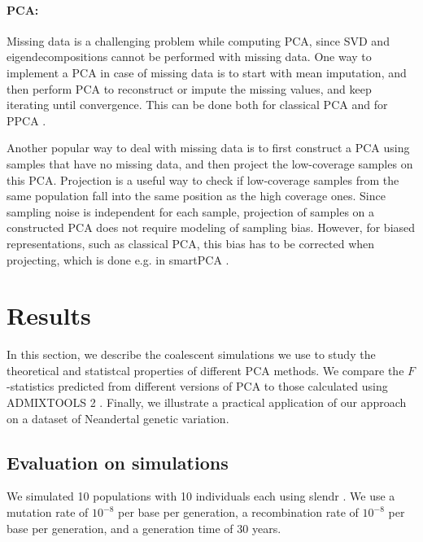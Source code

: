 \documentclass[12pt, letterpaper]{article}
\begin{document}
\paragraph{PCA:}
Missing data is a challenging problem while computing PCA, since SVD and eigendecompositions cannot be performed with missing data. One way to implement a PCA in case of missing data is to start with mean imputation, and then perform PCA to reconstruct or impute the missing values, and keep iterating until convergence. This can be done both for classical PCA \cite{meisner_large-scale_2021} and for PPCA \cite{tipping_probabilistic_1999-1}.  

Another popular way to deal with missing data is to first construct a PCA using samples that have no missing data, and then project the low-coverage samples on this PCA. Projection is a useful way to check if low-coverage samples from the same population fall into the same position as the high coverage ones. Since sampling noise is independent for each sample, projection of samples on a constructed PCA does not require modeling of sampling bias. However, for biased representations, such as classical PCA, this bias has to be corrected when projecting, which is done e.g. in smartPCA \cite{patterson_population_2006}.

\section{Results}
In this section, we describe the coalescent simulations we use to study the theoretical and statistcal properties of different PCA methods. We compare the $F$-statistics predicted from different versions of PCA to those calculated using ADMIXTOOLS 2 \cite{maier_limits_2022}. Finally, we illustrate a practical application of our approach on a dataset of Neandertal genetic variation. 

\subsection{Evaluation on simulations}
We simulated 10 populations with 10 individuals each using slendr \cite{petr_slendr_2022}. We use a mutation rate of $10^{-8}$ per base per generation, a recombination rate of $10^{-8}$ per base per generation, and a generation time of 30 years. 
\end{document}
